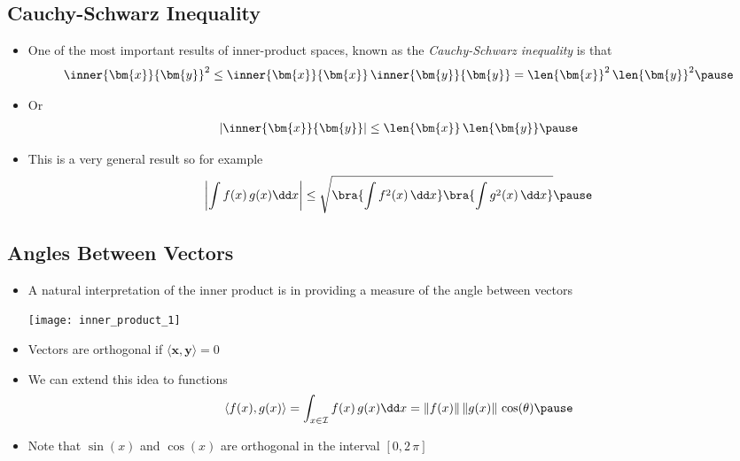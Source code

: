 \begin{slide}
\section{Cauchy-Schwarz Inequality}

\begin{PauseHighLight}
  \begin{itemize}
  \item One of the most important results of inner-product spaces,
      known as the \emph{Cauchy-Schwarz inequality} is that
      \begin{align*}
        \inner{\bm{x}}{\bm{y}}^2 \leq \inner{\bm{x}}{\bm{x}} \,
        \inner{\bm{y}}{\bm{y}} = \len{\bm{x}}^2\,\len{\bm{y}}^2\pause
      \end{align*}
    \item Or
      \begin{align*}
         | \inner{\bm{x}}{\bm{y}}| \leq   \len{\bm{x}}\,\len{\bm{y}}\pause
      \end{align*}
    \item This is a very general result so for example
      \begin{align*}
        \left| \int  f(x)\,g(x) \dd x \right| \leq  \sqrt{\bra{\int f^2(x)\,
        \dd x} \bra{\int g^2(x)\, \dd x}}\pause
      \end{align*}
  \end{itemize}
\end{PauseHighLight}
  

\end{slide}



\begin{slide}
\section[-2]{Angles Between Vectors}

\begin{PauseHighLight}
  \begin{itemize}
  \item A natural interpretation of the inner product is in providing a
    measure of the angle between vectors\pause
    \begin{center}
      \texttt{[image: inner\_product\_1]}
    \end{center}
  \item Vectors are orthogonal if $\langle \bm{x}, \bm{y} \rangle = 0$\pause
  \item We can extend this idea to functions
    \begin{align*}
      \langle f(x), g(x) \rangle = \int_{x \in \mathcal{I}}
      f(x)\, g(x) \dd x = \|f(x)\| \, \|g(x)\|\, \cos(\theta)\pause
    \end{align*}
  \item Note that $\sin(x)$ and $\cos(x)$ are orthogonal in the interval
    $[0,2\,\pi]$\pause
  \end{itemize}
\end{PauseHighLight}


\end{slide}

